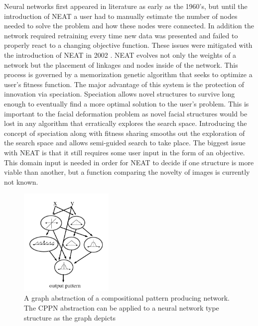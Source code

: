 Neural networks first appeared in literature as early as the 1960's, but until the introduction of NEAT a user had to manually 
estimate the number of nodes needed to solve the problem and how these nodes were connected. In addition the network required
retraining every time new data was presented and failed to properly react to a changing objective function. These issues were
mitigated with the introduction of NEAT in 2002 \cite{stanley2002evolving}. NEAT evolves not only the weights of a network but
the placement of linkages and nodes inside of the network. This process is governed by a memorization genetic algorithm that 
seeks to optimize a user's fitness function. The major advantage of this system is the protection of innovation via speciation.
Speciation allows novel structures to survive long enough to eventually find a more optimal solution to the user's problem. 
This is important to the facial deformation problem as novel facial structures would be lost in any algorithm that erratically
explores the search space. Introducing the concept of speciation along with fitness sharing smooths out the exploration of the
search space and allows semi-guided search to take place. The biggest issue with NEAT is that it still requires some
user input in the form of an objective. This domain input is needed in order for NEAT to decide if one structure is more
viable than another, but a function comparing the novelty of images is currently not known. 

\begin{figure}
 \centering
 \label{fig:paper:CPPN}
 \includegraphics[width=0.4\textwidth]{../../rec/paper/cppn.png}
 \caption{A graph abstraction of a compositional pattern producing network. The CPPN abstraction can be applied to a neural network type structure as the graph depicts \cite{stanley2002evolving}}
\end{figure}


